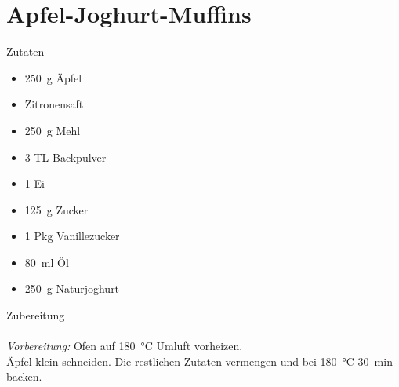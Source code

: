 \section*{Apfel-Joghurt-Muffins}
\ihead{}\ohead{}
\cfoot{}
{\Large Zutaten}
\begin{multicols}{2}
\begin{itemize}
    \item \SI{250}{g} Äpfel
    \item Zitronensaft
    \item \SI{250}{g} Mehl
    \item \num{3} TL Backpulver
    \item \num{1} Ei
    \item \SI{125}{g} Zucker
    \item \num{1} Pkg Vanillezucker
    \item \SI{80}{ml} Öl
    \item \SI{250}{g} Naturjoghurt
\end{itemize}
\end{multicols}
\noindent
{\Large Zubereitung}\\
\\
\textit{Vorbereitung:} Ofen auf \SI{180}{\celsius} Umluft vorheizen.\\
Äpfel klein schneiden.
Die restlichen Zutaten vermengen und bei \SI{180}{\celsius} \SI{30}{min} backen.